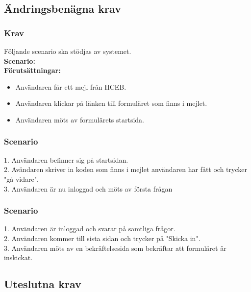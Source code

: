 \documentclass{article}
\begin{document}
    \newpage
    \subsection{Ändringsbenägna krav}
    
     \subsubsection{Krav}
    Följande scenario ska stödjas av systemet.
        \\
       \indent \textbf{Scenario:}
        \\
       \indent \textbf{Förutsättningar:}
            \begin{itemize}
                \item  Användaren får ett mejl från HCEB.
                \item Användaren klickar på länken till formuläret som finns i mejlet.
                \item Användaren möts av formulärets startsida.
            \end{itemize}
 
    \subsubsection{Scenario}
    1. Användaren befinner sig på startsidan. \\
    2. Avändaren skriver in koden som finns i mejlet användaren har fått och trycker "gå vidare". \\
    3. Användaren är nu inloggad och möts av första frågan\\
    
    \subsubsection{Scenario}
    1. Användaren är inloggad och svarar på samtliga frågor. \\
    2. Användaren kommer till sista sidan och trycker på "Skicka in". \\
    3. Användaren möts av en bekräftelsesida som bekräftar att formuläret är inskickat.
    
    
    
    \subsection{Uteslutna krav}
    
  
   
\end{document}

